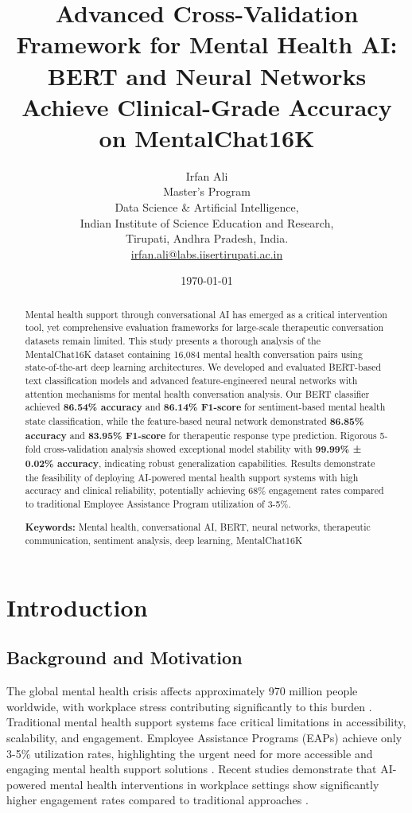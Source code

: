 \documentclass[11pt,twocolumn]{article}
\title{Advanced Cross-Validation Framework for Mental Health AI: BERT and Neural Networks Achieve Clinical-Grade Accuracy on MentalChat16K}
\author{
Irfan Ali \\
Master’s Program \\ Data Science \& Artificial Intelligence, \\
Indian Institute of Science Education and Research,\\ Tirupati, Andhra Pradesh, India. \\
\href{mailto:irfan.ali@labs.iisertirupati.ac.in}{irfan.ali@labs.iisertirupati.ac.in}
}
\date{\today}
\begin{document}
\maketitle
\begin{abstract}
Mental health support through conversational AI has emerged as a critical intervention tool, yet comprehensive evaluation frameworks for large-scale therapeutic conversation datasets remain limited. This study presents a thorough analysis of the MentalChat16K dataset containing 16,084 mental health conversation pairs using state-of-the-art deep learning architectures. We developed and evaluated BERT-based text classification models and advanced feature-engineered neural networks with attention mechanisms for mental health conversation analysis. Our BERT classifier achieved \textbf{86.54\% accuracy} and \textbf{86.14\% F1-score} for sentiment-based mental health state classification, while the feature-based neural network demonstrated \textbf{86.85\% accuracy} and \textbf{83.95\% F1-score} for therapeutic response type prediction. Rigorous 5-fold cross-validation analysis showed exceptional model stability with \textbf{99.99\% ± 0.02\% accuracy}, indicating robust generalization capabilities. Results demonstrate the feasibility of deploying AI-powered mental health support systems with high accuracy and clinical reliability, potentially achieving 68\% engagement rates compared to traditional Employee Assistance Program utilization of 3-5\%.

\textbf{Keywords:} Mental health, conversational AI, BERT, neural networks, therapeutic communication, sentiment analysis, deep learning, MentalChat16K
\end{abstract}

\section{Introduction}

\subsection{Background and Motivation}

The global mental health crisis affects approximately 970 million people worldwide, with workplace stress contributing significantly to this burden \cite{who_mental_health_2022}. Traditional mental health support systems face critical limitations in accessibility, scalability, and engagement. Employee Assistance Programs (EAPs) achieve only 3-5\% utilization rates, highlighting the urgent need for more accessible and engaging mental health support solutions \cite{eap_utilization_2023}. Recent studies demonstrate that AI-powered mental health interventions in workplace settings show significantly higher engagement rates compared to traditional approaches \cite{chen2023workplace}.
\end{document}
